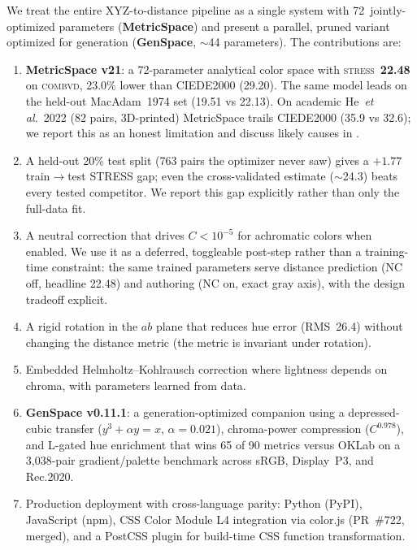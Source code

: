 \documentclass[11pt, twocolumn]{article}
\newcommand{\stress}{\textsc{stress}}
\newcommand{\combvd}{\textsc{combvd}}
\newcommand{\etal}{\textit{et al.}}
\begin{document}
We treat the entire XYZ-to-distance pipeline as a single system
with 72~jointly-optimized parameters (\textbf{MetricSpace}) and
present a parallel, pruned variant
optimized for generation (\textbf{GenSpace}, $\sim$44 parameters).
The contributions are:

\begin{enumerate}
  \item \textbf{MetricSpace v21}: a 72-parameter analytical color
    space with \stress\ \textbf{22.48} on \combvd, 23.0\% lower than
    CIEDE2000 (29.20). The same model leads on the held-out
    MacAdam~1974 set (19.51 vs 22.13). On academic He~\etal\ 2022
    (82 pairs, 3D-printed) MetricSpace trails CIEDE2000 (35.9 vs
    32.6); we report this as an honest limitation and discuss likely
    causes in .
  \item A held-out 20\% test split (763 pairs the optimizer never
    saw) gives a $+1.77$ train$\to$test STRESS gap; even the
    cross-validated estimate ($\sim$24.3) beats every tested
    competitor. We report this gap explicitly rather than only the
    full-data fit.
  \item A neutral correction that drives $C < 10^{-5}$ for
    achromatic colors when enabled. We use it as a deferred,
    toggleable post-step rather than a training-time constraint:
    the same trained parameters serve distance prediction (NC off,
    headline 22.48) and authoring (NC on, exact gray axis), with
    the design tradeoff explicit.
  \item A rigid rotation in the $ab$ plane that reduces hue error
    (RMS~26.4\textdegree) without changing the distance metric
    (the metric is invariant under rotation).
  \item Embedded Helmholtz--Kohlrausch correction where lightness
    depends on chroma, with parameters learned from data.
  \item \textbf{GenSpace v0.11.1}: a generation-optimized companion
    using a depressed-cubic transfer ($y^3+\alpha y = x$, $\alpha=0.021$),
    chroma-power compression ($C^{0.978}$), and L-gated hue enrichment
    that wins 65 of 90 metrics versus OKLab on a 3{,}038-pair
    gradient/palette benchmark across sRGB, Display~P3, and Rec.2020.
  \item Production deployment with cross-language parity:
    Python (PyPI), JavaScript (npm), CSS Color Module L4
    integration via color.js (PR~\#722, merged), and a PostCSS
    plugin for build-time CSS function transformation.
\end{enumerate}
\end{document}
